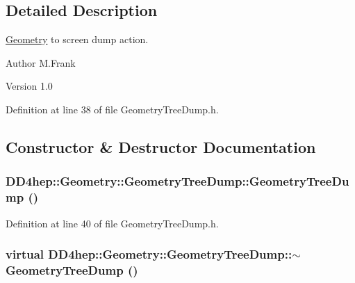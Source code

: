 \subsection{Detailed Description}
\hyperlink{namespace_d_d4hep_1_1_geometry}{Geometry} to screen dump action. \begin{DoxyAuthor}{Author}
M.Frank 
\end{DoxyAuthor}
\begin{DoxyVersion}{Version}
1.0 
\end{DoxyVersion}


Definition at line 38 of file GeometryTreeDump.h.

\subsection{Constructor \& Destructor Documentation}
\hypertarget{class_d_d4hep_1_1_geometry_1_1_geometry_tree_dump_a47f8f93072e4f019169b6f7853c4cb77}{
\subsubsection[{GeometryTreeDump}]{\setlength{\rightskip}{0pt plus 5cm}DD4hep::Geometry::GeometryTreeDump::GeometryTreeDump ()}}
\label{class_d_d4hep_1_1_geometry_1_1_geometry_tree_dump_a47f8f93072e4f019169b6f7853c4cb77}


Definition at line 40 of file GeometryTreeDump.h.\hypertarget{class_d_d4hep_1_1_geometry_1_1_geometry_tree_dump_a3d194c9411bf2c915462a3f086d6b8f5}{
\subsubsection[{$\sim$GeometryTreeDump}]{\setlength{\rightskip}{0pt plus 5cm}virtual DD4hep::Geometry::GeometryTreeDump::$\sim$GeometryTreeDump ()}}
\label{class_d_d4hep_1_1_geometry_1_1_geometry_tree_dump_a3d194c9411bf2c915462a3f086d6b8f5}


